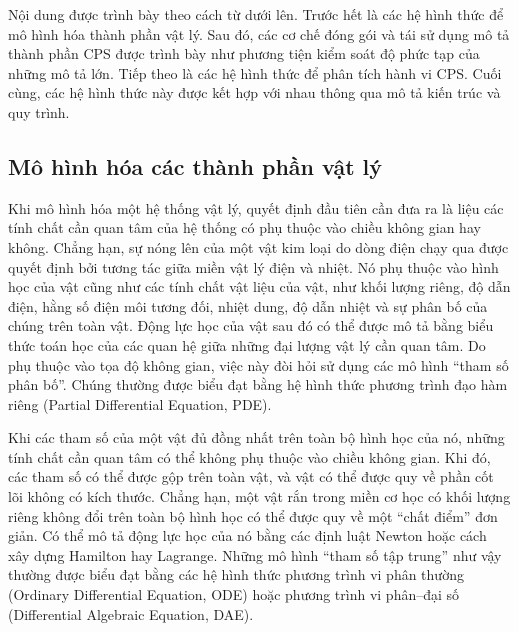 Nội dung được trình bày theo cách từ dưới lên. Trước hết là các hệ hình thức để mô hình hóa thành phần vật lý. Sau đó, các cơ chế đóng gói và tái sử dụng mô tả thành phần CPS được trình bày như phương tiện kiểm soát độ phức tạp của những mô tả lớn. Tiếp theo là các hệ hình thức để phân tích hành vi CPS. Cuối cùng, các hệ hình thức này được kết hợp với nhau thông qua mô tả kiến trúc và quy trình.

\subsection{Mô hình hóa các thành phần vật lý}
Khi mô hình hóa một hệ thống vật lý, quyết định đầu tiên cần đưa ra là liệu các tính chất cần quan tâm của hệ thống có phụ thuộc vào chiều không gian hay không. Chẳng hạn, sự nóng lên của một vật kim loại do dòng điện chạy qua được quyết định bởi tương tác giữa miền vật lý điện và nhiệt. Nó phụ thuộc vào hình học của vật cũng như các tính chất vật liệu của vật, như khối lượng riêng, độ dẫn điện, hằng số điện môi tương đối, nhiệt dung, độ dẫn nhiệt và sự phân bố của chúng trên toàn vật. Động lực học của vật sau đó có thể được mô tả bằng biểu thức toán học của các quan hệ giữa những đại lượng vật lý cần quan tâm. Do phụ thuộc vào tọa độ không gian, việc này đòi hỏi sử dụng các mô hình ``tham số phân bố''. Chúng thường được biểu đạt bằng hệ hình thức phương trình đạo hàm riêng (Partial Differential Equation, PDE).

Khi các tham số của một vật đủ đồng nhất trên toàn bộ hình học của nó, những tính chất cần quan tâm có thể không phụ thuộc vào chiều không gian. Khi đó, các tham số có thể được gộp trên toàn vật, và vật có thể được quy về phần cốt lõi không có kích thước. Chẳng hạn, một vật rắn trong miền cơ học có khối lượng riêng không đổi trên toàn bộ hình học có thể được quy về một ``chất điểm'' đơn giản. Có thể mô tả động lực học của nó bằng các định luật Newton hoặc cách xây dựng Hamilton hay Lagrange. Những mô hình ``tham số tập trung'' như vậy thường được biểu đạt bằng các hệ hình thức phương trình vi phân thường (Ordinary Differential Equation, ODE) hoặc phương trình vi phân--đại số (Differential Algebraic Equation, DAE).

